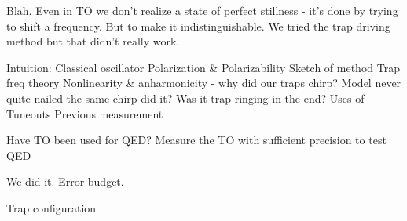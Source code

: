Blah. Even in TO we don't realize a state of perfect stillness - it's
done by trying to shift a frequency. But to make it indistinguishable.
We tried the trap driving method but that didn't really work.




Intuition: Classical oscillator
Polarization \& Polarizability 
Sketch of method
Trap freq theory
Nonlinearity \& anharmonicity - why did our traps chirp? Model never quite nailed the same chirp did it? Was it trap ringing in the end?
Uses of Tuneouts
Previous measurement




Have TO been used for QED?
Measure the TO with sufficient precision to test QED




We did it.
Error budget.



Trap configuration

